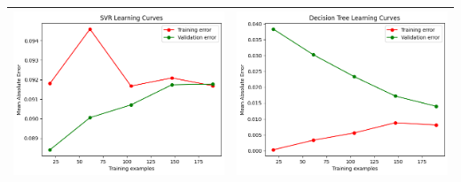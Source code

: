\begin{table}[H]
    \centering
    \footnotesize
    \setlength\tabcolsep{0pt}
    \begin{tabularx}{\textwidth}{|X|X|}
        \hline
        \includegraphics[width=\linewidth, trim=0 0 0 0]{images/SVR_lc80.png} &
        \includegraphics[width=\linewidth, trim=0 0 0 0]{images/DecisionTree_lc80.png} \\
        \hline

\end{tabularx}
\end{table}
